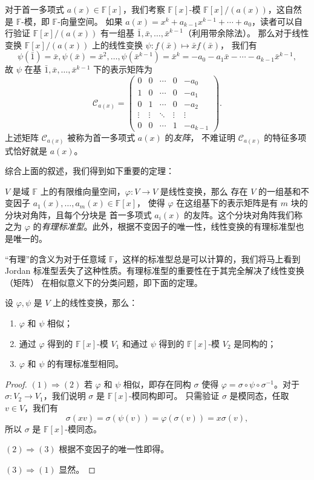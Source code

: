 \documentclass[fontset=none,zihao=-4]{Notes}
\begin{document}
对于首一多项式 $a(x)\in\mathbb{F}[x]$，我们考察 $\mathbb{F}[x]$-模
$\mathbb{F}[x]/(a(x))$，这自然是 $\mathbb{F}$-模，即 $\mathbb{F}$-向量空间。
如果 $a(x)=x^k+a_{k-1}x^{k-1}+\cdots+a_0$，读者可以自行验证 $\mathbb{F}[x]/(a(x))$
有一组基 $\bar 1,\bar x,\dots,\bar x^{k-1}$（利用带余除法）。
那么对于线性变换 $\mathbb{F}[x]/(a(x))$ 上的线性变换 $\psi:f(\bar x)\mapsto \bar xf(\bar x)$，
我们有
\[
  \psi(\bar 1)=\bar x, 
  \psi(\bar x)=\bar x^2,\dots,
  \psi(\bar x^{k-1})=\bar x^k=-a_0-a_1\bar x-\cdots-a_{k-1}\bar x^{k-1},
\]
故 $\psi$ 在基 $\bar 1,\bar x,\dots,\bar x^{k-1}$ 下的表示矩阵为
\[
  \mathcal{C}_{a(x)}=\begin{pmatrix}
    0 & 0 & \cdots & 0 & -a_0\\
    1 & 0 & \cdots & 0 & -a_1\\
    0 & 1 & \cdots & 0 & -a_2\\
    \vdots & \vdots & \ddots & \vdots & \vdots \\
    0 & 0 & \cdots & 1 & -a_{k-1}
  \end{pmatrix}  .
\]
上述矩阵 $\mathcal{C}_{a(x)}$ 被称为首一多项式 $a(x)$ 的\emph{友阵}，
不难证明 $\mathcal{C}_{a(x)}$ 的特征多项式恰好就是 $a(x)$。

综合上面的叙述，我们得到如下重要的定理：
\begin{theorem}[线性变换的有理标准型]
  $V$ 是域 $\mathbb{F}$ 上的有限维向量空间，$\varphi:V\to V$ 是线性变换，那么
  存在 $V$ 的一组基和不变因子 $a_1(x),\dots,a_m(x)\in\mathbb{F}[x]$，
  使得 $\varphi$ 在这组基下的表示矩阵是有 $m$ 块的分块对角阵，且每个分块是
  首一多项式 $a_i(x)$ 的友阵。这个分块对角阵我们称之为 $\varphi$
  的\emph{有理标准型}。此外，根据不变因子的唯一性，线性变换的有理标准型也是唯一的。
\end{theorem}

“有理”的含义为对于任意域 $\mathbb{F}$，这样的标准型总是可以计算的，我们将马上看到
Jordan 标准型丢失了这种性质。有理标准型的重要性在于其完全解决了线性变换（矩阵）
在相似意义下的分类问题，即下面的定理。

\begin{theorem}\label{thm:similar equiv rational form}
  设 $\varphi,\psi$ 是 $V$ 上的线性变换，那么：
  \begin{enumerate}
    \item $\varphi$ 和 $\psi$ 相似；
    \item 通过 $\varphi$ 得到的 $\mathbb{F}[x]$-模 $V_1$
    和通过 $\psi$ 得到的 $\mathbb{F}[x]$-模 $V_2$ 是同构的；
    \item $\varphi$ 和 $\psi$ 的有理标准型相同。
  \end{enumerate}
\end{theorem}
\begin{proof}
  $(1)\Rightarrow (2)$ 若 $\varphi$ 和 $\psi$ 相似，即存在同构 $\sigma$
  使得 $\varphi=\sigma\circ \psi\circ\sigma^{-1}$。对于
  $\sigma:V_2\to V_1$，我们说明 $\sigma$ 是 $\mathbb{F}[x]$-模同构即可。
  只需验证 $\sigma$ 是模同态，任取 $v\in V$，我们有
  \[
    \sigma(xv)=\sigma(\psi(v))=\varphi(\sigma(v))=x\sigma(v),
  \]
  所以 $\sigma$ 是 $\mathbb{F}[x]$-模同态。

  $(2)\Rightarrow (3)$ 根据不变因子的唯一性即得。

  $(3)\Rightarrow (1)$ 显然。
\end{proof}
\end{document}
